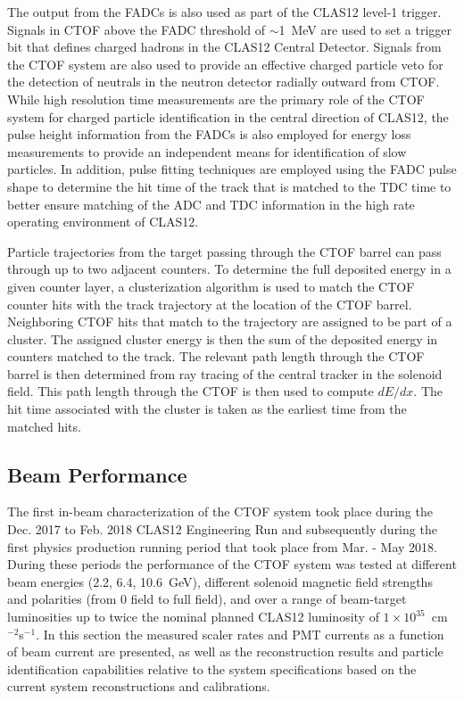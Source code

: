 \documentclass{elsart}
\begin{document}
The output from the FADCs is also used as part of the CLAS12 level-1 trigger. Signals in CTOF above
the FADC threshold of $\sim$1~MeV are used to set a trigger bit that defines charged hadrons in the
CLAS12 Central Detector. Signals from the CTOF system are also used to provide an effective charged
particle veto for the detection of neutrals in the neutron detector radially outward from CTOF. While high
resolution time measurements are the primary role of the CTOF system for charged particle identification
in the central direction of CLAS12, the pulse height information from the FADCs is also employed for energy
loss measurements to provide an independent means for identification of slow particles. In addition, pulse
fitting techniques are employed using the FADC pulse shape to determine the hit time of the track that is
matched to the TDC time to better ensure matching of the ADC and TDC information in the high rate
operating environment of CLAS12.

Particle trajectories from the target passing through the CTOF barrel can pass through up to two adjacent
counters. To determine the full deposited energy in a given counter layer, a clusterization algorithm is used
to match the CTOF counter hits with the track trajectory at the location of the CTOF barrel. Neighboring
CTOF hits that match to the trajectory are assigned to be part of a cluster. The assigned cluster energy is
then the sum of the deposited energy in counters matched to the track. The relevant path length through
the CTOF barrel is then determined from ray tracing of the central tracker in the solenoid field. This path
length through the CTOF is then used to compute $dE/dx$. The hit time associated with the cluster is
taken as the earliest time from the matched hits.
  
\subsection{Beam Performance}  
\label{sec:beam}

The first in-beam characterization of the CTOF system took place during the Dec. 2017 to Feb. 2018
CLAS12 Engineering Run and subsequently during the first physics production running period that
took place from Mar. - May 2018. During these periods the performance of the CTOF system was
tested at different beam energies (2.2, 6.4, 10.6~GeV), different solenoid magnetic field strengths
and polarities (from 0 field to full field), and over a range of beam-target luminosities up to twice the
nominal planned CLAS12 luminosity of $1 \times 10^{35}$~cm$^{-2}$s$^{-1}$. In this section the
measured scaler rates and PMT currents as a function of beam current are presented, as well as the
reconstruction results and particle identification capabilities relative to the system specifications
based on the current system reconstructions and calibrations.
\end{document}
